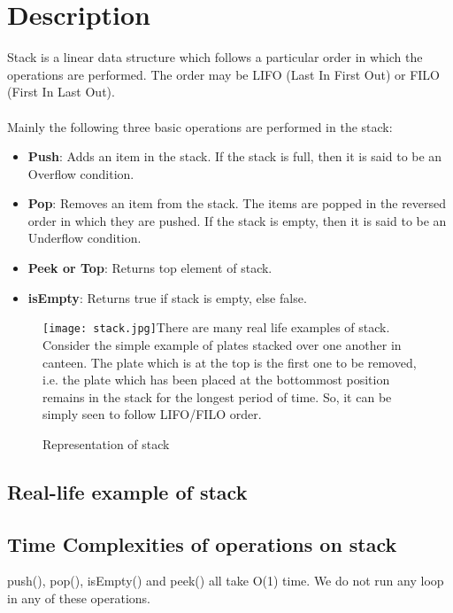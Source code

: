\documentclass[11pt,fleqn]{book} %
\begin{document}
\section{Description}
Stack is a linear data structure which follows a particular order in which the operations are performed. The order may be LIFO (Last In First Out) or FILO (First In Last Out).\\ ~\\
Mainly the following three basic operations are performed in the stack:
\begin{itemize}
\item \textbf{Push}: Adds an item in the stack. If the stack is full, then it is said to be an Overflow condition.
\item \textbf{Pop}: Removes an item from the stack. The items are popped in the reversed order in which they are pushed. If the stack is empty, then it is said to be an Underflow condition.
\item \textbf{Peek or Top}: Returns top element of stack.
\item \textbf{isEmpty}: Returns true if stack is empty, else false.
\end{itemize}
\begin{figure}[H]
	\centering
	\texttt{[image: stack.jpg]}There are many real life examples of stack. Consider the simple example of plates stacked over one another in canteen. The plate which is at the top is the first one to be removed, i.e. the plate which has been placed at the bottommost position remains in the stack for the longest period of time. So, it can be simply seen to follow LIFO/FILO order.
	\caption{Representation of stack}
\end{figure}
\newpage
\subsection{Real-life example of stack}


\subsection{Time Complexities of operations on stack}
push(), pop(), isEmpty() and peek() all take O(1) time. We do not run any loop in any of these operations.
\end{document}
